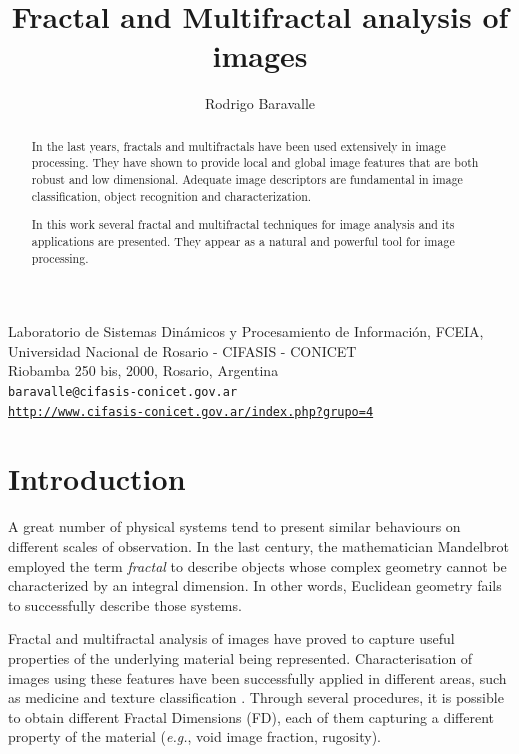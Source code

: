 \documentclass[oneside,a4paper,english,links,12pt]{article}
\title{Fractal and Multifractal analysis of images}
\author{Rodrigo Baravalle}
\begin{document}
\maketitle
\begin{center}
\small{Laboratorio de Sistemas Din\'amicos y Procesamiento de Informaci\'on, FCEIA, Universidad Nacional de Rosario - CIFASIS - CONICET}\\
\small{Riobamba 250 bis, 2000, Rosario, Argentina}\\

\texttt{baravalle@cifasis-conicet.gov.ar}\\
\texttt{\url{http://www.cifasis-conicet.gov.ar/index.php?grupo=4}}
\end{center}

\begin{abstract}
In the last years, fractals and multifractals have been used extensively in image processing. They have shown to provide local and global image features that are both robust and low dimensional. Adequate image descriptors are fundamental in image classification, object recognition and characterization.

In this work several fractal and multifractal techniques for image analysis and its applications are presented. They appear as a natural and powerful tool for image processing.
\end{abstract}

\section{Introduction}
A great number of physical systems tend to present similar behaviours on different scales of observation. In the last century, the mathematician Mandelbrot employed the term {\em fractal} to describe objects whose complex geometry cannot be characterized by an integral dimension. In other words, Euclidean geometry fails to successfully describe those systems.

Fractal and multifractal analysis of images have proved to capture useful properties of the underlying material being represented. Characterisation of images using these features have been successfully applied in different areas, such as medicine \cite{Andjelkovic2008,Yu2011} and texture classification \cite{Wendt2009}. Through several procedures, it is possible to obtain different Fractal Dimensions (FD), each of them capturing a different property of the material ({\em e.g.}, void image fraction, rugosity).
\end{document}
